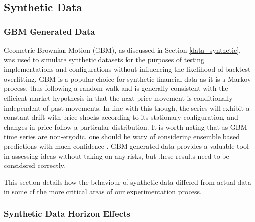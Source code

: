 \documentclass[a4paper,11pt,oneside]{article}
\theoremstyle{plain}
\theoremstyle{definition}
\begin{document}
	
	\newpage
	\subsection{Synthetic Data}\label{results_synth}
	
	\subsubsection{GBM Generated Data}\label{results_gbm_data}
	
	Geometric Brownian Motion (GBM), as discussed in Section \ref{data_synthetic}, was used to simulate synthetic datasets for the purposes of testing implementations and configurations without influencing the likelihood of backtest overfitting. GBM is a popular choice for synthetic financial data as it is a Markov process, thus following a random walk and is generally consistent with the efficient market hypothesis in that the next price movement is conditionally independent of past movements. In line with this though, the series will exhibit a constant drift with price shocks according to its stationary configuration, and changes in price follow a particular distribution. It is worth noting that as GBM time series are non-ergodic, one should be wary of considering ensemble based predictions with much confidence \citep{Peters}. GBM generated data provides a valuable tool in assessing ideas without taking on any risks, but these results need to be considered correctly. \newline
	
	This section details how the behaviour of synthetic data differed from actual data in some of the more critical areas of our experimentation process.
	
	\subsubsection{Synthetic Data Horizon Effects}\label{results_synthdata_mse}
	
\end{document}

